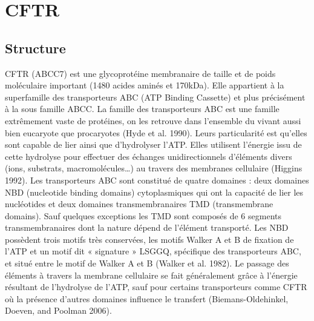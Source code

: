 
\chapter{CFTR} %


\label{ch:02-03} %


\section{Structure}
CFTR (ABCC7) est une glycoprotéine membranaire de taille et de poids moléculaire important  (1480 acides aminés et 170kDa). Elle appartient à la superfamille des transporteurs ABC (ATP Binding Cassette) et plus précisément à la sous famille ABCC.
La famille des transporteurs ABC est une famille extrêmement vaste de protéines, on les retrouve dans l’ensemble du vivant aussi bien eucaryote que procaryotes (Hyde et al. 1990)\cite{hyde_structural_1990}. Leurs particularité est qu’elles sont capable de lier ainsi que d’hydrolyser l’ATP. Elles utilisent l’énergie issu de cette hydrolyse pour effectuer des échanges unidirectionnels d’éléments divers (ions, substrats, macromolécules…) au travers des membranes cellulaire (Higgins 1992)\cite{higgins_abc_1992}. Les transporteurs ABC sont constitué de quatre domaines : deux domaines NBD (nucleotide binding domains) cytoplasmiques qui ont la capacité de lier les nucléotides et deux domaines transmembranaires TMD (transmembrane domains). Sauf quelques exceptions les TMD sont composés de 6 segments transmembranaires dont la nature dépend de l’élément transporté. Les NBD possèdent trois motifs très conservées, les motifs Walker A et B de fixation de l’ATP et un motif dit « signature » LSGGQ, spécifique des transporteurs ABC, et situé entre le motif de Walker A et B (Walker et al. 1982)\cite{walker_distantly_1982}. Le passage des éléments à travers la membrane cellulaire se fait généralement grâce à l’énergie résultant de l’hydrolyse de l’ATP, sauf pour certains transporteurs comme CFTR où la présence d’autres domaines influence le transfert (Biemans-Oldehinkel, Doeven, and Poolman 2006)\cite{biemans-oldehinkel_abc_2006}.
